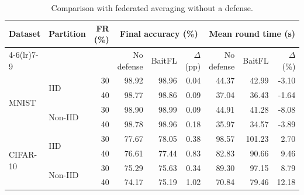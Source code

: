 \begin{table}[t]\centering\footnotesize\setlength{\tabcolsep}{5pt}
\caption{Comparison with federated averaging without a defense.}\label{tab:baseline}
\begin{tabular}{llrrrrrrr}\toprule
\multirow{2}{*}{Dataset} & \multirow{2}{*}{Partition} & \multirow{2}{*}{FR (\%)} & \multicolumn{3}{c}{Final accuracy (\%)} & \multicolumn{3}{c}{Mean round time (s)} \\
\cmidrule(lr){4-6}\cmidrule(lr){7-9}
& & & No defense & BaitFL & $\Delta$ (pp) & No defense & BaitFL & $\Delta$ (\%) \\ \midrule
\multirow{4}{*}{MNIST} & \multirow{2}{*}{IID} & 30 & 98.92 & 98.96 & 0.04 & 44.37 & 42.99 & -3.10 \\
 &  & 40 & 98.77 & 98.86 & 0.09 & 37.04 & 36.43 & -1.64 \\
 & \multirow{2}{*}{Non-IID} & 30 & 98.90 & 98.99 & 0.09 & 44.91 & 41.28 & -8.08 \\
 &  & 40 & 98.78 & 98.96 & 0.18 & 35.97 & 34.57 & -3.89 \\
\midrule
\multirow{4}{*}{CIFAR-10} & \multirow{2}{*}{IID} & 30 & 77.67 & 78.05 & 0.38 & 98.57 & 101.23 & 2.70 \\
 &  & 40 & 76.61 & 77.44 & 0.83 & 82.83 & 90.66 & 9.46 \\
 & \multirow{2}{*}{Non-IID} & 30 & 75.29 & 75.63 & 0.34 & 89.30 & 97.15 & 8.79 \\
 &  & 40 & 74.17 & 75.19 & 1.02 & 70.84 & 79.46 & 12.18 \\
\bottomrule\end{tabular}\end{table}
